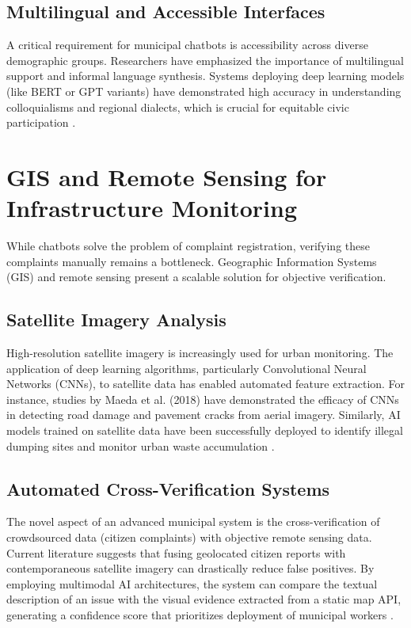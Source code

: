 \documentclass[12pt,a4paper]{article}
\begin{document}
\subsection{Multilingual and Accessible Interfaces}
A critical requirement for municipal chatbots is accessibility across diverse demographic groups. Researchers have emphasized the importance of multilingual support and informal language synthesis. Systems deploying deep learning models (like BERT or GPT variants) have demonstrated high accuracy in understanding colloquialisms and regional dialects, which is crucial for equitable civic participation \cite{wirtz2019}.

\section{GIS and Remote Sensing for Infrastructure Monitoring}
While chatbots solve the problem of complaint registration, verifying these complaints manually remains a bottleneck. Geographic Information Systems (GIS) and remote sensing present a scalable solution for objective verification.

\subsection{Satellite Imagery Analysis}
High-resolution satellite imagery is increasingly used for urban monitoring. The application of deep learning algorithms, particularly Convolutional Neural Networks (CNNs), to satellite data has enabled automated feature extraction. For instance, studies by Maeda et al. (2018) \cite{maeda2018} have demonstrated the efficacy of CNNs in detecting road damage and pavement cracks from aerial imagery. Similarly, AI models trained on satellite data have been successfully deployed to identify illegal dumping sites and monitor urban waste accumulation \cite{wang2020}.

\subsection{Automated Cross-Verification Systems}
The novel aspect of an advanced municipal system is the cross-verification of crowdsourced data (citizen complaints) with objective remote sensing data. Current literature suggests that fusing geolocated citizen reports with contemporaneous satellite imagery can drastically reduce false positives. By employing multimodal AI architectures, the system can compare the textual description of an issue with the visual evidence extracted from a static map API, generating a confidence score that prioritizes deployment of municipal workers \cite{zhang2021}.
\end{document}
